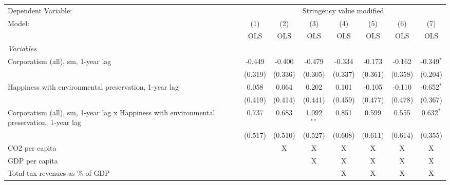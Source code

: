 
\begingroup
\centering
\begin{tabular}{lccccccc}
   \toprule
   Dependent Variable: & \multicolumn{7}{c}{Stringency value modified}\\
   Model:                                                                                    & (1)     & (2)     & (3)          & (4)     & (5)     & (6)     & (7)\\  
                                                                                             &  OLS    & OLS     & OLS          & OLS     & OLS     & OLS     & OLS\\  
   \midrule
   \emph{Variables}\\
   Corporatism (all), sm, 1-year lag                                                         & -0.449  & -0.400  & -0.479       & -0.334  & -0.173  & -0.162  & -0.349$^{*}$\\   
                                                                                             & (0.319) & (0.336) & (0.305)      & (0.337) & (0.361) & (0.358) & (0.204)\\   
   Happiness with environmental preservation, 1-year lag                                     & 0.058   & 0.064   & 0.202        & 0.101   & -0.105  & -0.110  & -0.652$^{*}$\\   
                                                                                             & (0.419) & (0.414) & (0.441)      & (0.459) & (0.477) & (0.478) & (0.367)\\   
   Corporatism (all), sm, 1-year lag x Happiness with environmental preservation, 1-year lag & 0.737   & 0.683   & 1.092$^{**}$ & 0.851   & 0.599   & 0.555   & 0.632$^{*}$\\   
                                                                                             & (0.517) & (0.510) & (0.527)      & (0.608) & (0.611) & (0.614) & (0.355)\\   
   CO2 per capita                                                                            &         & X       & X            & X       & X       & X       & X\\  
   GDP per capita                                                                            &         &         & X            & X       & X       & X       & X\\  
   Total tax revenues as \% of GDP                                                           &         &         &              & X       & X       & X       & X\\  

\end{tabular}

